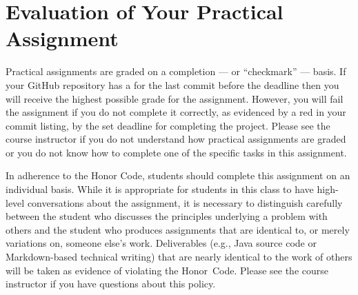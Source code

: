 \documentclass[11pt]{article}
\newcommand{\checkmark}{\ding{51}}
\newcommand{\naughtmark}{\ding{55}}
\begin{document}
\section*{Evaluation of Your Practical Assignment}

Practical assignments are graded on a completion --- or ``checkmark'' --- basis.
If your GitHub repository has a \checkmark{} for the last commit before the
deadline then you will receive the highest possible grade for the assignment.
However, you will fail the assignment if you do not complete it correctly, as
evidenced by a red \naughtmark{} in your commit listing, by the set deadline for
completing the project. Please see the course instructor if you do not
understand how practical assignments are graded or you do not know how to
complete one of the specific tasks in this assignment.


In adherence to the Honor Code, students should complete this assignment on an
individual basis. While it is appropriate for students in this class to have
high-level conversations about the assignment, it is necessary to distinguish
carefully between the student who discusses the principles underlying a problem
with others and the student who produces assignments that are identical to, or
merely variations on, someone else's work. Deliverables (e.g., Java source code
or Markdown-based technical writing) that are nearly identical to the work of
others will be taken as evidence of violating the \mbox{Honor Code}. Please see
the course instructor if you have questions about this policy.
\end{document}
